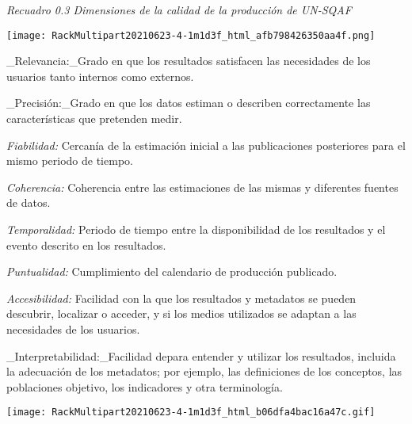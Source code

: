 \documentclass[
]{book}
\begin{document}
\emph{Recuadro 0.3 Dimensiones de la calidad de la producción de UN-SQAF}

\texttt{[image: RackMultipart20210623-4-1m1d3f\_html\_afb798426350aa4f.png]}

\_Relevancia:\_Grado en que los resultados satisfacen las necesidades de los usuarios tanto internos como externos.

\_Precisión:\_Grado en que los datos estiman o describen correctamente las características que pretenden medir.

\emph{Fiabilidad:} Cercanía de la estimación inicial a las publicaciones posteriores para el mismo periodo de tiempo.

\emph{Coherencia:} Coherencia entre las estimaciones de las mismas y diferentes fuentes de datos.

\emph{Temporalidad:} Periodo de tiempo entre la disponibilidad de los resultados y el evento descrito en los resultados.

\emph{Puntualidad:} Cumplimiento del calendario de producción publicado.

\emph{Accesibilidad:} Facilidad con la que los resultados y metadatos se pueden descubrir, localizar o acceder, y si los medios utilizados se adaptan a las necesidades de los usuarios.

\_Interpretabilidad:\_Facilidad depara entender y utilizar los resultados, incluida la adecuación de los metadatos; por ejemplo, las definiciones de los conceptos, las poblaciones objetivo, los indicadores y otra terminología.

\texttt{[image: RackMultipart20210623-4-1m1d3f\_html\_b06dfa4bac16a47c.gif]}
\end{document}
